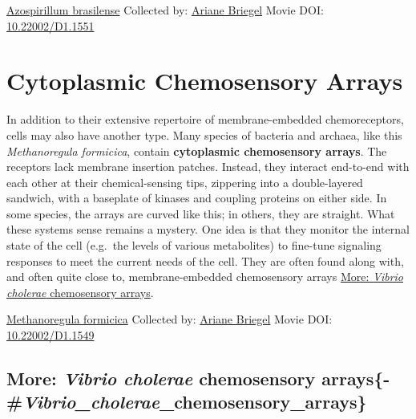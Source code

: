 \documentclass[]{tufte-book}
\begin{document}
\hypertarget{htmlwidget-d036a4893bc2c2ebe90e}{}

\label{fig:7-4a}\protect\hyperlink{tree}{Azospirillum brasilense} Collected by: \protect\hyperlink{ariane_briegel}{Ariane Briegel} Movie DOI: \href{https://doi.org/10.22002/D1.1551}{10.22002/D1.1551}

\hypertarget{cytoplasmic-chemosensory-arrays}{%
\section{Cytoplasmic Chemosensory Arrays}\label{cytoplasmic-chemosensory-arrays}}

In addition to their extensive repertoire of membrane-embedded chemoreceptors, cells may also have another type. Many species of bacteria and archaea, like this \emph{Methanoregula formicica}, contain \textbf{cytoplasmic chemosensory arrays}. The receptors lack membrane insertion patches. Instead, they interact end-to-end with each other at their chemical-sensing tips, zippering into a double-layered sandwich, with a baseplate of kinases and coupling proteins on either side. In some species, the arrays are curved like this; in others, they are straight. What these systems sense remains a mystery. One idea is that they monitor the internal state of the cell (e.g.~the levels of various metabolites) to fine-tune signaling responses to meet the current needs of the cell. They are often found along with, and often quite close to, membrane-embedded chemosensory arrays \protect\hyperlink{ux2aVibrio_choleraeux2a_chemosensory_arrays}{More: \emph{Vibrio cholerae} chemosensory arrays}.



\hypertarget{htmlwidget-01fe8892fa79823d6fe3}{}

\label{fig:7-5}\protect\hyperlink{tree}{Methanoregula formicica} Collected by: \protect\hyperlink{ariane_briegel}{Ariane Briegel} Movie DOI: \href{https://doi.org/10.22002/D1.1549}{10.22002/D1.1549}

\hypertarget{more-vibrio-cholerae-chemosensory-arrays-vibrio_cholerae_chemosensory_arrays}{%
\subsection{\texorpdfstring{More: \emph{Vibrio cholerae} chemosensory arrays\{-\#\emph{Vibrio\_cholerae}\_chemosensory\_arrays\}}{More: Vibrio cholerae chemosensory arrays\{-\#Vibrio\_cholerae\_chemosensory\_arrays\}}}\label{more-vibrio-cholerae-chemosensory-arrays-vibrio_cholerae_chemosensory_arrays}}
\end{document}
